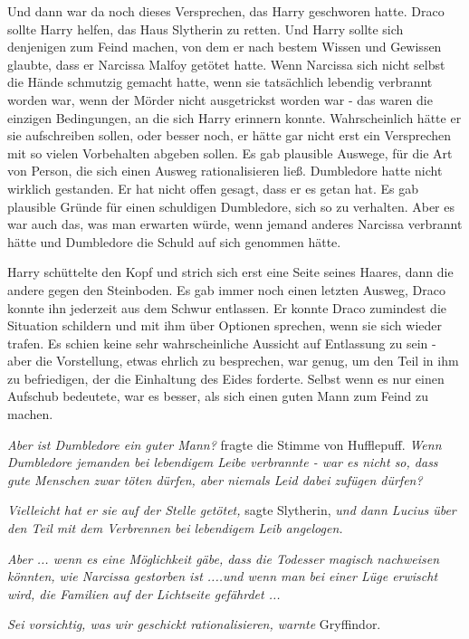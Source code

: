 Und dann war da noch dieses Versprechen, das Harry geschworen hatte. Draco
sollte Harry helfen, das Haus Slytherin zu retten. Und Harry sollte sich
denjenigen zum Feind machen, von dem er nach bestem Wissen und Gewissen glaubte,
dass er Narcissa Malfoy getötet hatte. Wenn Narcissa sich nicht selbst die Hände
schmutzig gemacht hatte, wenn sie tatsächlich lebendig verbrannt worden war,
wenn der Mörder nicht ausgetrickst worden war - das waren die einzigen
Bedingungen, an die sich Harry erinnern konnte. Wahrscheinlich hätte er sie
aufschreiben sollen, oder besser noch, er hätte gar nicht erst ein Versprechen
mit so vielen Vorbehalten abgeben sollen. Es gab plausible Auswege, für die Art
von Person, die sich einen Ausweg rationalisieren ließ. Dumbledore hatte nicht
wirklich gestanden. Er hat nicht offen gesagt, dass er es getan hat. Es gab
plausible Gründe für einen schuldigen Dumbledore, sich so zu verhalten. Aber es
war auch das, was man erwarten würde, wenn jemand anderes Narcissa verbrannt
hätte und Dumbledore die Schuld auf sich genommen hätte.

Harry schüttelte den Kopf und strich sich erst eine Seite seines Haares, dann
die andere gegen den Steinboden. Es gab immer noch einen letzten Ausweg, Draco
konnte ihn jederzeit aus dem Schwur entlassen. Er konnte Draco zumindest die
Situation schildern und mit ihm über Optionen sprechen, wenn sie sich wieder
trafen. Es schien keine sehr wahrscheinliche Aussicht auf Entlassung zu sein -
aber die Vorstellung, etwas ehrlich zu besprechen, war genug, um den Teil in ihm
zu befriedigen, der die Einhaltung des Eides forderte. Selbst wenn es nur einen
Aufschub bedeutete, war es besser, als sich einen guten Mann zum Feind zu
machen.

\emph{Aber ist Dumbledore ein guter Mann?} fragte die Stimme von Hufflepuff.
\emph{Wenn Dumbledore jemanden bei lebendigem Leibe verbrannte - war es nicht
so, dass gute Menschen zwar töten dürfen, aber niemals Leid dabei zufügen
dürfen?}

\emph{Vielleicht hat er sie auf der Stelle getötet,} sagte Slytherin, \emph{und
dann Lucius über den Teil mit dem Verbrennen bei lebendigem Leib angelogen.}

\emph{Aber ... wenn es eine Möglichkeit gäbe, dass die Todesser magisch
nachweisen könnten, wie Narcissa gestorben ist ....und wenn man bei einer Lüge
erwischt wird, die Familien auf der Lichtseite gefährdet ...}

\emph{Sei vorsichtig, was wir geschickt rationalisieren, warnte} Gryffindor.

